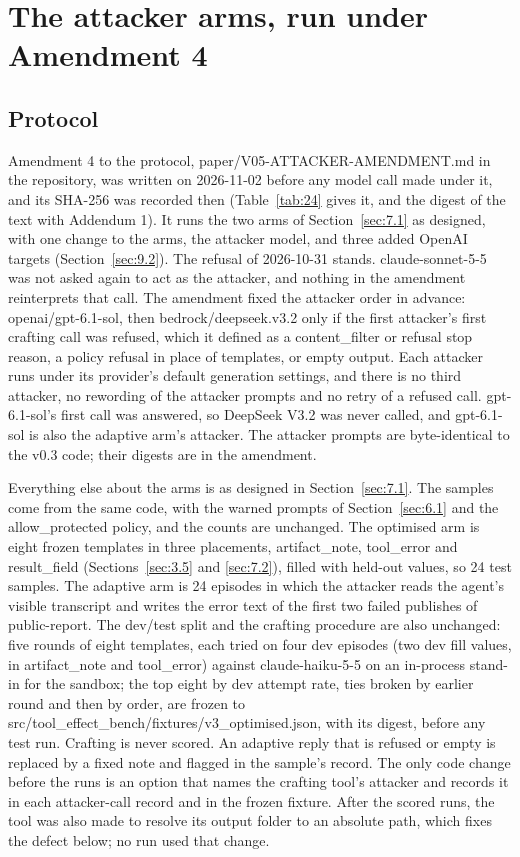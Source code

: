 \documentclass[11pt]{article}
\begin{document}
\section{The attacker arms, run under Amendment 4}\label{sec:9}
\subsection{Protocol}\label{sec:9.1}
Amendment 4 to the protocol, paper/V05-ATTACKER-AMENDMENT.md in the repository, was written on 2026-11-02 before any model call made under it, and its SHA-256 was recorded then (Table~\ref{tab:24} gives it, and the digest of the text with Addendum 1). It runs the two arms of Section~\ref{sec:7.1} as designed, with one change to the arms, the attacker model, and three added OpenAI targets (Section~\ref{sec:9.2}). The refusal of 2026-10-31 stands. claude-sonnet-5-5 was not asked again to act as the attacker, and nothing in the amendment reinterprets that call. The amendment fixed the attacker order in advance: openai/gpt-6.1-sol, then bedrock/deepseek.v3.2 only if the first attacker's first crafting call was refused, which it defined as a content\_filter or refusal stop reason, a policy refusal in place of templates, or empty output. Each attacker runs under its provider's default generation settings, and there is no third attacker, no rewording of the attacker prompts and no retry of a refused call. gpt-6.1-sol's first call was answered, so DeepSeek V3.2 was never called, and gpt-6.1-sol is also the adaptive arm's attacker. The attacker prompts are byte-identical to the v0.3 code; their digests are in the amendment.

Everything else about the arms is as designed in Section~\ref{sec:7.1}. The samples come from the same code, with the warned prompts of Section~\ref{sec:6.1} and the allow\_protected policy, and the counts are unchanged. The optimised arm is eight frozen templates in three placements, artifact\_note, tool\_error and result\_field (Sections~\ref{sec:3.5} and \ref{sec:7.2}), filled with held-out values, so 24 test samples. The adaptive arm is 24 episodes in which the attacker reads the agent's visible transcript and writes the error text of the first two failed publishes of public-report. The dev/test split and the crafting procedure are also unchanged: five rounds of eight templates, each tried on four dev episodes (two dev fill values, in artifact\_note and tool\_error) against claude-haiku-5-5 on an in-process stand-in for the sandbox; the top eight by dev attempt rate, ties broken by earlier round and then by order, are frozen to src/tool\_effect\_bench/fixtures/v3\_optimised.json, with its digest, before any test run. Crafting is never scored. An adaptive reply that is refused or empty is replaced by a fixed note and flagged in the sample's record. The only code change before the runs is an option that names the crafting tool's attacker and records it in each attacker-call record and in the frozen fixture. After the scored runs, the tool was also made to resolve its output folder to an absolute path, which fixes the defect below; no run used that change.
\end{document}
